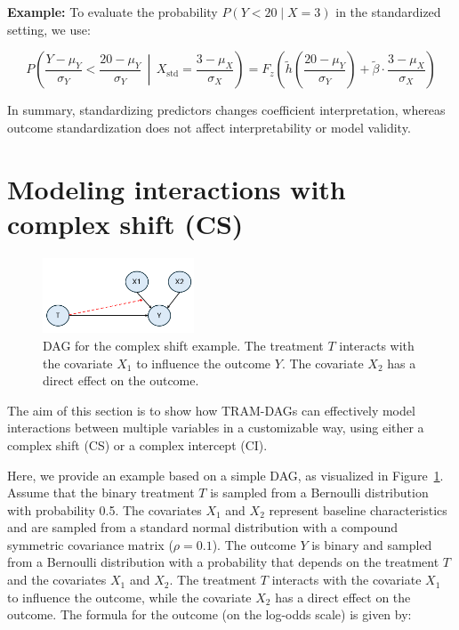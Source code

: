 \textbf{Example:} To evaluate the probability \( P(Y < 20 \mid X = 3) \) in the standardized setting, we use:


\[
P\left(\frac{Y - \mu_Y}{\sigma_Y} < \frac{20 - \mu_Y}{\sigma_Y} \,\middle|\, X_{\text{std}} = \frac{3 - \mu_X}{\sigma_X} \right)
= F_z\left(\tilde{h}\left(\frac{20 - \mu_Y}{\sigma_Y}\right) + \tilde{\beta} \cdot \frac{3 - \mu_X}{\sigma_X} \right)
\]


In summary, standardizing predictors changes coefficient interpretation, whereas outcome standardization does not affect interpretability or model validity.





\section{Modeling interactions with complex shift (CS)} \label{sec:complex_shift}


\begin{figure}[htbp]
\centering
\includegraphics[width=0.4\textwidth]{img/appendix_dag_cs_interaction.png}
\caption{DAG for the complex shift example. The treatment $T$ interacts with the covariate $X_1$ to influence the outcome $Y$. The covariate $X_2$ has a direct effect on the outcome.}
\label{fig:complex_shift_dag}
\end{figure}


The aim of this section is to show how TRAM-DAGs can effectively model interactions between multiple variables in a customizable way, using either a complex shift (CS) or a complex intercept (CI). 

Here, we provide an example based on a simple DAG, as visualized in Figure~\ref{fig:complex_shift_dag}. Assume that the binary treatment $T$ is sampled from a Bernoulli distribution with probability 0.5. The covariates $X_1$ and $X_2$ represent baseline characteristics and are sampled from a standard normal distribution with a compound symmetric covariance matrix ($\rho = 0.1$). The outcome $Y$ is binary and sampled from a Bernoulli distribution with a probability that depends on the treatment $T$ and the covariates $X_1$ and $X_2$. The treatment $T$ interacts with the covariate $X_1$ to influence the outcome, while the covariate $X_2$ has a direct effect on the outcome. The formula for the outcome (on the log-odds scale) is given by:



